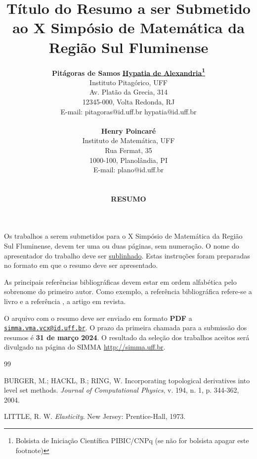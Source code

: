 \documentclass[a4paper,10pt]{article}
\begin{document}
\title{\vspace{-1cm} 
\Large{\bf Título do Resumo a ser Submetido 
ao X Simpósio de Matemática da Região Sul Fluminense}
}

\author{ 
{\bf {\large Pitágoras de Samos}} \hspace*{1cm} 
{\bf {\large \underline{Hypatia de Alexandria}\footnote{Bolsista de Iniciação Científica PIBIC/CNPq (se não for bolsista apagar este footnote)}
}}\\[4pt]
{\small Instituto Pitagórico, UFF} \\
{\small Av. Platão da Grecia, 314} \\
{\small 12345-000, Volta Redonda, RJ} \\
{\small E-mail: pitagoras@id.uff.br \hspace*{1cm}  hypatia@id.uff.br} 
\\
\\
{\bf {\large Henry Poincaré}}  \\[4pt]
{\small Instituto de Matemática, UFF} \\
{\small Rua Fermat, 35} \\
{\small 1000-100, Planolândia, PI} \\
{\small E-mail: plano@id.uff.br}
 \\
 \\
 \\
\textbf{RESUMO}
}

\date{}
\maketitle
\thispagestyle{fancy}


Os trabalhos a serem submetidos para o X Simpósio de Matemática da Região Sul Fluminense, devem ter uma ou duas páginas, sem numeração. O nome do apresentador do trabalho deve ser \underline{sublinhado}. Estas instruções foram preparadas no formato em que o resumo deve ser apresentado. 

As principais referências bibliográficas devem estar em ordem alfabética pelo sobrenome do primeiro autor. Como exemplo, a referência bibliográfica \cite{hig} refere-se a livro e a referência
\cite{key1}, a artigo em revista.

O arquivo com o resumo deve ser enviado em formato \textbf{PDF} a \href{mailto:simma.vma.vcx@id.uff.br}{\tt\color{blue}simma.vma.vcx@id.uff.br}.  O prazo da primeira chamada para a submissão dos resumos é \textbf{\color{red} 31 de março 2024}. O resultado da seleção dos trabalhos aceitos será divulgado  na página do SIMMA  {\color{blue}\url{http://simma.uff.br}}.

\begin{thebibliography}{99}

 BURGER, M.; HACKL, B.; RING, W. Incorporating topological derivatives
into level set methods. \emph{Journal of Computational Physics}, v. 194, n. 1, p. 344-362,
2004.

  LITTLE, R. W. \emph{Elasticity}. New Jersey: Prentice-Hall, 1973.
\end{thebibliography}
\end{document}

